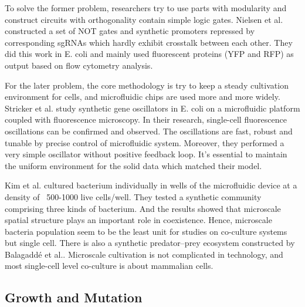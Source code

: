 \documentclass[fleqn,10pt]{wlscirep}
\begin{document}
To solve the former problem, researchers try to use parts with modularity\cite{Moon2012} and construct circuits with
orthogonality contain simple logic gates\cite{Wang2011}. Nielsen et al.\cite{Nielsen2014} constructed a set of NOT gates and synthetic promoters repressed by corresponding sgRNAs which hardly exhibit crosstalk between each other. They did this work in E. coli and mainly used fluorescent proteins (YFP and RFP) as output based on flow cytometry
analysis.

For the later problem, the core methodology is try to keep a steady cultivation environment for cells, and microfluidic chips are used more and more widely\cite{Ferry2011}. Stricker et al.\cite{Stricker2008} study synthetic gene oscillators in E. coli on a microfluidic platform coupled with fluorescence microscopy. In their research, single-cell fluorescence oscillations can be confirmed and observed. The oscillations are fast, robust and tunable by precise control of microfluidic system. Moreover, they performed a very simple oscillator without positive feedback loop. It's essential to maintain the uniform environment for the solid data which matched their model.

Kim et al.\cite{Kim2008} cultured bacterium  individually in wells of the microfluidic device at a density of ~500-1000 live cells/well. They tested a synthetic community comprising three kinds of bacterium. And the results showed that microscale spatial structure plays an important role in coexistence. Hence, microscale bacteria population seem to be the least unit for studies on co-culture systems but single cell. There is also a synthetic predator–prey ecosystem constructed by Balagaddé et al.\cite{Balagadde2008}. Microscale cultivation is not complicated in technology, and most single-cell level co-culture is about mammalian cells\cite{Frimat2011,Hong2012}. 

\subsection[]{Growth and Mutation}
\end{document}
